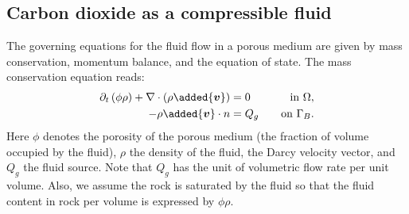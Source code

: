 
\subsection{Carbon dioxide as a compressible fluid} \label{Sec:CO2}
The governing equations for the fluid flow in a porous medium are given by mass conservation, momentum balance, and the equation of state.
The mass conservation equation reads:
\begin{equation}\label{Eq:Mass_Conserv}
\begin{aligned}
\partial_t\left(\phi\rho\right)+\nabla\cdot\left(\rho\added{\bm{v}}\right)&=0  \quad  &\text{in~} \Omega, \\
-\rho\added{\bm{v}} \cdot n &=Q_g  \quad  &\text{on~} \Gamma_B.       
\end{aligned}
\end{equation}
Here $\phi$ denotes the porosity of the porous medium (the fraction of volume occupied by the fluid), $\rho$ the density of the fluid,  the Darcy velocity vector, and $Q_g$ the fluid source. Note that $Q_g$ has the unit of volumetric flow rate per unit volume. Also, we assume the rock is saturated by the fluid so that the fluid content in rock per volume is expressed by $\phi\rho$.


